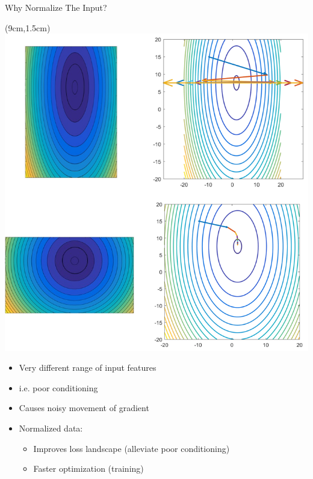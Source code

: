 \documentclass[serif, aspectratio=169]{beamer}
\begin{document}
\begin{frame}{Why Normalize The Input?}
	
	\begin{textblock*}{5cm}(9cm,1.5cm) %
		\includegraphics[keepaspectratio, scale=0.25]{pic/poorcond}
	\end{textblock*}
	
	\begin{itemize}
		\item Very different range of input features
		\item i.e. poor conditioning
		\item Causes noisy movement of gradient
	\end{itemize}
	\vspace{1.5cm}
	\begin{itemize}
		\item Normalized data:
		\begin{itemize}
			\item Improves loss landscape \newline (alleviate poor conditioning)
			\item Faster optimization (training)
		\end{itemize}
	\end{itemize}
	
\end{frame}
\end{document}
